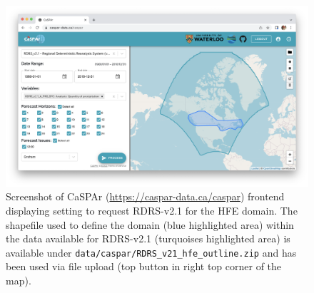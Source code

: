 \documentclass[10pt,a4paper,titlepage,parskip]{scrartcl}
\begin{document}
\begin{figure}[h]
	\centering
	\includegraphics[width=\linewidth]{figures/caspar-request-hfe.png}
	\caption{Screenshot of CaSPAr (\url{https://caspar-data.ca/caspar}) frontend displaying setting to request RDRS-v2.1 for the HFE domain. The shapefile used to define the domain (blue highlighted area) within the data available for RDRS-v2.1 (turquoises highlighted area) is available under \texttt{data/caspar/RDRS\_v21\_hfe\_outline.zip} and has been used via file upload (top button in right top corner of the map).}
	\label{fig:request_data_caspar}
\end{figure}
\pagebreak
\end{document}
